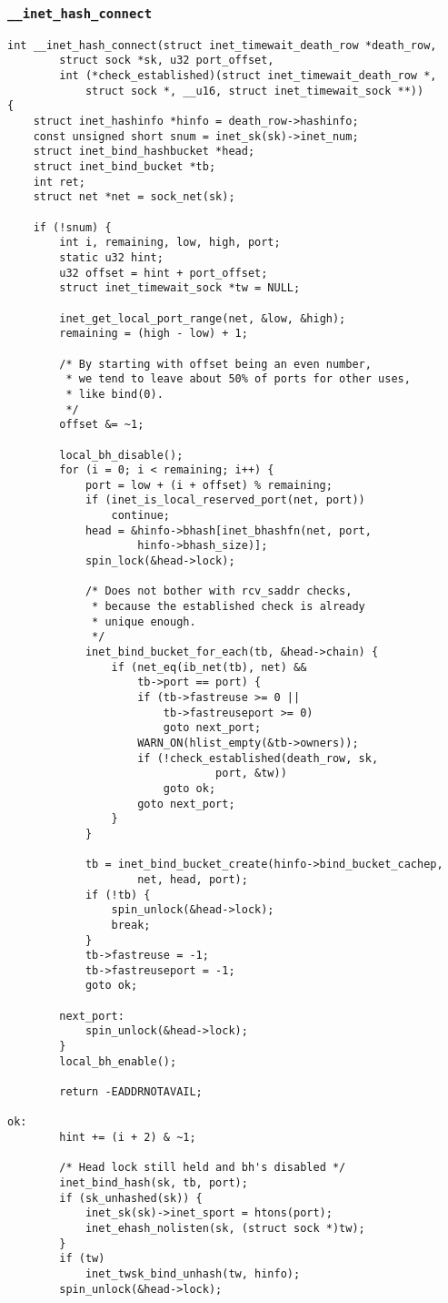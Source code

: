 		\subsubsection{\texttt{__inet_hash_connect}}		
\begin{verbatim}
int __inet_hash_connect(struct inet_timewait_death_row *death_row,
		struct sock *sk, u32 port_offset,
		int (*check_established)(struct inet_timewait_death_row *,
			struct sock *, __u16, struct inet_timewait_sock **))
{
	struct inet_hashinfo *hinfo = death_row->hashinfo;
	const unsigned short snum = inet_sk(sk)->inet_num;
	struct inet_bind_hashbucket *head;
	struct inet_bind_bucket *tb;
	int ret;
	struct net *net = sock_net(sk);

	if (!snum) {
		int i, remaining, low, high, port;
		static u32 hint;
		u32 offset = hint + port_offset;
		struct inet_timewait_sock *tw = NULL;

		inet_get_local_port_range(net, &low, &high);
		remaining = (high - low) + 1;

		/* By starting with offset being an even number,
		 * we tend to leave about 50% of ports for other uses,
		 * like bind(0).
		 */
		offset &= ~1;

		local_bh_disable();
		for (i = 0; i < remaining; i++) {
			port = low + (i + offset) % remaining;
			if (inet_is_local_reserved_port(net, port))
				continue;
			head = &hinfo->bhash[inet_bhashfn(net, port,
					hinfo->bhash_size)];
			spin_lock(&head->lock);

			/* Does not bother with rcv_saddr checks,
			 * because the established check is already
			 * unique enough.
			 */
			inet_bind_bucket_for_each(tb, &head->chain) {
				if (net_eq(ib_net(tb), net) &&
				    tb->port == port) {
					if (tb->fastreuse >= 0 ||
					    tb->fastreuseport >= 0)
						goto next_port;
					WARN_ON(hlist_empty(&tb->owners));
					if (!check_established(death_row, sk,
								port, &tw))
						goto ok;
					goto next_port;
				}
			}

			tb = inet_bind_bucket_create(hinfo->bind_bucket_cachep,
					net, head, port);
			if (!tb) {
				spin_unlock(&head->lock);
				break;
			}
			tb->fastreuse = -1;
			tb->fastreuseport = -1;
			goto ok;

		next_port:
			spin_unlock(&head->lock);
		}
		local_bh_enable();

		return -EADDRNOTAVAIL;

ok:
		hint += (i + 2) & ~1;

		/* Head lock still held and bh's disabled */
		inet_bind_hash(sk, tb, port);
		if (sk_unhashed(sk)) {
			inet_sk(sk)->inet_sport = htons(port);
			inet_ehash_nolisten(sk, (struct sock *)tw);
		}
		if (tw)
			inet_twsk_bind_unhash(tw, hinfo);
		spin_unlock(&head->lock);


\end{verbatim}
